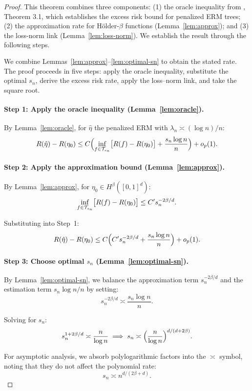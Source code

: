 \documentclass[12pt]{article}
\begin{document}
\begin{proof}
This theorem combines three components: (1) the oracle inequality from \citet{xuStatisticalOptimalityOptimal2026}, Theorem 3.1, which establishes the excess risk bound for penalized ERM trees; (2) the approximation rate for Hölder-$\beta$ functions (Lemma~\ref{lem:approx}); and (3) the loss-norm link (Lemma~\ref{lem:loss-norm}). We establish the result through the following steps.

We combine Lemmas~\ref{lem:approx}--\ref{lem:optimal-sn} to obtain the stated rate. The proof proceeds in five steps: apply the oracle inequality, substitute the optimal $s_n$, derive the excess risk rate, apply the loss--norm link, and take the square root.

\paragraph{Step 1: Apply the oracle inequality (Lemma~\ref{lem:oracle}).}
By Lemma~\ref{lem:oracle}, for $\hat\eta$ the penalized ERM with $\lambda_n \asymp (\log n)/n$:
\[
R(\hat\eta) - R(\eta_0) \le C \Bigl( \inf_{f \in \mathcal{T}_{s_n}} \bigl[ R(f) - R(\eta_0) \bigr] + \frac{s_n \log n}{n} \Bigr) + o_p(1).
\]

\paragraph{Step 2: Apply the approximation bound (Lemma~\ref{lem:approx}).}
By Lemma~\ref{lem:approx}, for $\eta_0 \in H^\beta([0,1]^d)$:
\[
\inf_{f \in \mathcal{T}_{s_n}} \bigl[ R(f) - R(\eta_0) \bigr] \le C' s_n^{-2\beta/d}.
\]

Substituting into Step~1:
\[
R(\hat\eta) - R(\eta_0) \le C \Bigl( C' s_n^{-2\beta/d} + \frac{s_n \log n}{n} \Bigr) + o_p(1).
\]

\paragraph{Step 3: Choose optimal $s_n$ (Lemma~\ref{lem:optimal-sn}).}
By Lemma~\ref{lem:optimal-sn}, we balance the approximation term $s_n^{-2\beta/d}$ and the estimation term $s_n \log n / n$ by setting:
\[
s_n^{-2\beta/d} \asymp \frac{s_n \log n}{n}.
\]

Solving for $s_n$:
\[
s_n^{1 + 2\beta/d} \asymp \frac{n}{\log n} \implies s_n \asymp \Bigl( \frac{n}{\log n} \Bigr)^{d/(d + 2\beta)}.
\]

For asymptotic analysis, we absorb polylogarithmic factors into the $\asymp$ symbol, noting that they do not affect the polynomial rate:
\[
s_n \asymp n^{d/(2\beta + d)}.
\]


\end{proof}
\end{document}
